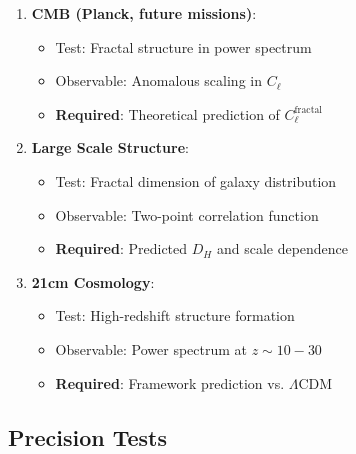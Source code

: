 \begin{enumerate}
    \item \textbf{CMB (Planck, future missions)}:
    \begin{itemize}
        \item Test: Fractal structure in power spectrum
        \item Observable: Anomalous scaling in $C_\ell$
        \item \textbf{Required}: Theoretical prediction of $C_\ell^{\text{fractal}}$
    \end{itemize}

    \item \textbf{Large Scale Structure}:
    \begin{itemize}
        \item Test: Fractal dimension of galaxy distribution
        \item Observable: Two-point correlation function
        \item \textbf{Required}: Predicted $D_H$ and scale dependence
    \end{itemize}

    \item \textbf{21cm Cosmology}:
    \begin{itemize}
        \item Test: High-redshift structure formation
        \item Observable: Power spectrum at $z \sim 10-30$
        \item \textbf{Required}: Framework prediction vs. $\Lambda$CDM
    \end{itemize}
\end{enumerate}

\subsection{Precision Tests}

